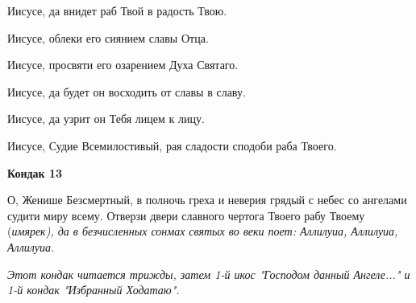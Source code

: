Иисусе, да внидет раб Твой в радость Твою. 

Иисусе, облеки его сиянием славы Отца. 

Иисусе, просвяти его озарением Духа Святаго. 

Иисусе, да будет он восходить от славы в славу. 

Иисусе, да узрит он Тебя лицем к лицу. 

Иисусе, Судие Всемилостивый, рая сладости сподоби раба Твоего.


\medskip


\bfseries Кондак 13\normalfont{}


О, Женише Безсмертный, в полночь греха и неверия грядый с небес со ангелами судити миру всему. Отверзи двери славного чертога Твоего рабу Твоему (\itshape имярек\normalfont{}), да в безчисленных сонмах святых во веки поет: Аллилуиа, Аллилуиа, Аллилуиа. 

\itshape Этот кондак читается трижды, затем 1-й икос "Господом данный Ангеле..." и 1-й кондак "Избранный Ходатаю".\normalfont{}


\mychapterending

 


